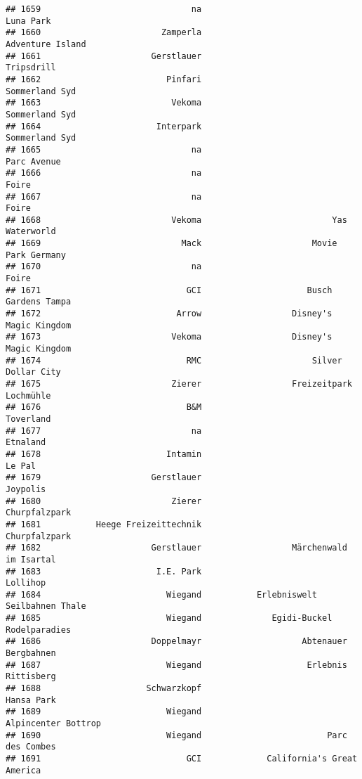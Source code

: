 \documentclass[
]{article}
\begin{document}
\begin{verbatim}
## 1659                              na                               Luna Park
## 1660                        Zamperla                        Adventure Island
## 1661                      Gerstlauer                              Tripsdrill
## 1662                         Pinfari                          Sommerland Syd
## 1663                          Vekoma                          Sommerland Syd
## 1664                       Interpark                          Sommerland Syd
## 1665                              na                             Parc Avenue
## 1666                              na                                   Foire
## 1667                              na                                   Foire
## 1668                          Vekoma                          Yas Waterworld
## 1669                            Mack                      Movie Park Germany
## 1670                              na                                   Foire
## 1671                             GCI                     Busch Gardens Tampa
## 1672                           Arrow                  Disney's Magic Kingdom
## 1673                          Vekoma                  Disney's Magic Kingdom
## 1674                             RMC                      Silver Dollar City
## 1675                          Zierer                  Freizeitpark Lochmühle
## 1676                             B&M                               Toverland
## 1677                              na                                Etnaland
## 1678                         Intamin                                  Le Pal
## 1679                      Gerstlauer                                Joypolis
## 1680                          Zierer                           Churpfalzpark
## 1681           Heege Freizeittechnik                           Churpfalzpark
## 1682                      Gerstlauer                  Märchenwald im Isartal
## 1683                       I.E. Park                                Lollihop
## 1684                         Wiegand           Erlebniswelt Seilbahnen Thale
## 1685                         Wiegand              Egidi-Buckel Rodelparadies
## 1686                      Doppelmayr                    Abtenauer Bergbahnen
## 1687                         Wiegand                     Erlebnis Rittisberg
## 1688                     Schwarzkopf                              Hansa Park
## 1689                         Wiegand                     Alpincenter Bottrop
## 1690                         Wiegand                         Parc des Combes
## 1691                             GCI             California's Great America 

\end{verbatim}
\end{document}
